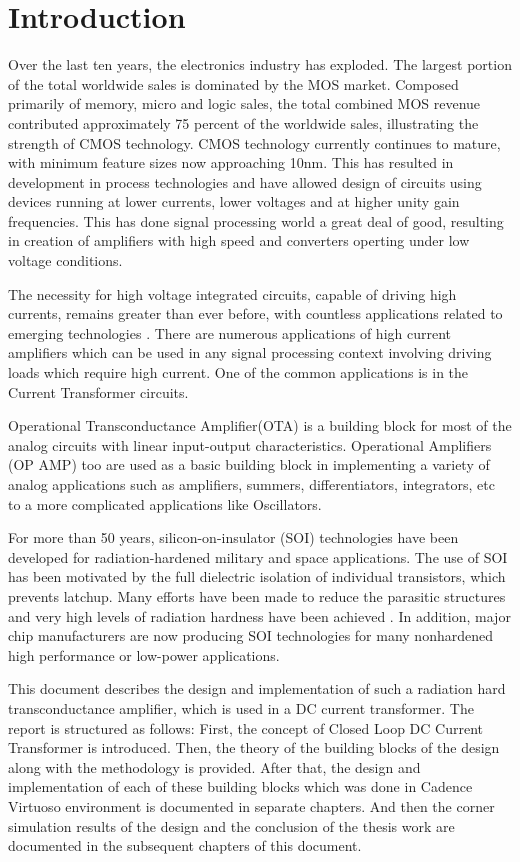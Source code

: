 \chapter{Introduction}
Over the last ten years, the electronics industry has exploded. The largest portion of the total worldwide sales is dominated by the MOS market. Composed primarily of memory, micro and logic sales, the total combined MOS revenue contributed approximately 75 percent of the worldwide sales, illustrating the strength of CMOS technology. CMOS technology currently continues to mature, with minimum feature sizes now approaching 10nm. This has resulted in development in process technologies and have allowed design of circuits using devices running at lower currents, lower voltages and at higher unity gain frequencies. This has done signal processing world a great deal of good, resulting in creation of amplifiers with high speed and converters operting under low voltage conditions.

The necessity for high voltage integrated circuits, capable of driving high currents, remains greater than ever before, with countless applications related to emerging technologies \cite{intro}. There are numerous applications of high current amplifiers which can be used in any signal processing context involving driving loads which require high current. One of the common applications is in the Current Transformer circuits.

Operational Transconductance Amplifier(OTA) is a building block for most of the analog circuits with linear input-output characteristics. Operational Amplifiers (OP AMP) too are used as a basic building block in implementing a variety of analog applications such as amplifiers, summers, differentiators, integrators, etc to a more complicated applications like Oscillators. 

For more than 50 years, silicon-on-insulator (SOI) technologies have been developed for radiation-hardened military and space applications.  The  use  of  SOI  has  been  motivated  by  the  full dielectric  isolation  of  individual  transistors,  which  prevents latchup. Many efforts have been made to reduce the parasitic structures and very high levels of radiation hardness have been achieved \cite{colinge}. In addition, major chip manufacturers are now producing SOI technologies for many nonhardened high performance or low-power applications.

This document describes the design and implementation of such a radiation hard transconductance amplifier, which is used in a DC current transformer. The report is structured as follows: First, the concept of Closed Loop DC Current Transformer is introduced. Then, the theory of the building blocks of the design along with the methodology is provided. After that, the design and implementation of each of these building blocks which was done in Cadence Virtuoso environment is documented in separate chapters. And then the corner simulation results of the design and the conclusion of the thesis work are documented in the subsequent chapters of this document.

